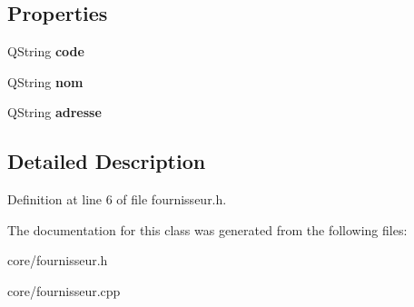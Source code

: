 \subsection*{Properties}
\begin{DoxyCompactItemize}
\item 
\hypertarget{class_fournisseur_a28a5068c1ba3b22133e0dbdae9c42fdc}{
QString {\bfseries code}}
\label{class_fournisseur_a28a5068c1ba3b22133e0dbdae9c42fdc}

\item 
\hypertarget{class_fournisseur_ab887a1c4585489235c26a5cb2c14cb0f}{
QString {\bfseries nom}}
\label{class_fournisseur_ab887a1c4585489235c26a5cb2c14cb0f}

\item 
\hypertarget{class_fournisseur_ae42a1aa45300ba7a145e7b46eeaeedcb}{
QString {\bfseries adresse}}
\label{class_fournisseur_ae42a1aa45300ba7a145e7b46eeaeedcb}

\end{DoxyCompactItemize}


\subsection{Detailed Description}


Definition at line 6 of file fournisseur.h.



The documentation for this class was generated from the following files:\begin{DoxyCompactItemize}
\item 
core/fournisseur.h\item 
core/fournisseur.cpp\end{DoxyCompactItemize}
